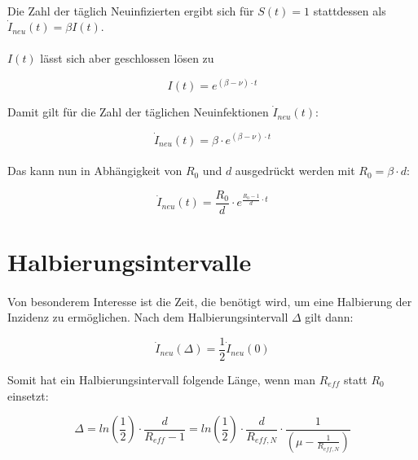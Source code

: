 \documentclass[a4paper]{article}
\begin{document}
    \paragraph{}Die Zahl der täglich Neuinfizierten ergibt sich für $S(t)=1$ stattdessen als $\dot{I}_{neu}(t) = \beta I(t)$. 

    \paragraph{}

    $I(t)$ lässt sich aber geschlossen lösen zu 

    $$ I(t) = e^{(\beta - \nu) \cdot t} $$ 

    Damit gilt für die Zahl der täglichen Neuinfektionen $\dot{I}_{neu}(t)$: 

    \begin{equation}
        \dot{I}_{neu}(t) = \beta \cdot e^{(\beta - \nu) \cdot t}
    \end{equation}

    \paragraph{}Das kann nun in Abhängigkeit von $R_0$ und $d$ ausgedrückt werden mit $R_0 = \beta \cdot d$: 

    \begin{equation}
        \dot{I}_{neu}(t) = \frac{R_0}{d} \cdot e^{\frac{R_0 - 1}{d} \cdot t}
    \end{equation}

    \section{Halbierungsintervalle}
    \paragraph{}Von besonderem Interesse ist die Zeit, die benötigt wird, um eine Halbierung der Inzidenz zu ermöglichen. Nach dem Halbierungsintervall $\Delta$ gilt dann: 

    $$ \dot{I}_{neu}(\Delta) = \frac{1}{2} \dot{I}_{neu}(0) $$
    
    Somit hat ein Halbierungsintervall folgende Länge, wenn man $R_{eff}$ statt $R_0$ einsetzt: 

    \begin{equation}
        \Delta = ln(\frac{1}{2}) \cdot \frac{d}{R_{eff} - 1} = ln(\frac{1}{2}) \cdot \frac{d}{R_{eff,N}} \cdot \frac{1}{ ( \mu - \frac{1}{R_{eff,N}} )}
    \end{equation}
\end{document}
